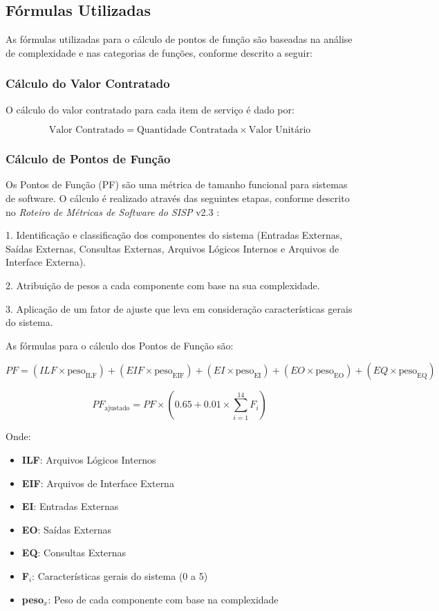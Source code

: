 \documentclass[12pt]{article}
\begin{document}
\subsection{Fórmulas Utilizadas}
As fórmulas utilizadas para o cálculo de pontos de função são baseadas na análise de complexidade e nas categorias de funções, conforme descrito a seguir:

\subsubsection{Cálculo do Valor Contratado}
O cálculo do valor contratado para cada item de serviço é dado por:

\begin{equation}
\text{Valor Contratado} = \text{Quantidade Contratada} \times \text{Valor Unitário}
\end{equation}

\subsubsection{Cálculo de Pontos de Função}

Os Pontos de Função (PF) são uma métrica de tamanho funcional para sistemas de software. O cálculo é realizado através das seguintes etapas, conforme descrito no \textit{Roteiro de Métricas de Software do SISP} v2.3 \cite{sisp}:

1. Identificação e classificação dos componentes do sistema (Entradas Externas, Saídas Externas, Consultas Externas, Arquivos Lógicos Internos e Arquivos de Interface Externa).

2. Atribuição de pesos a cada componente com base na sua complexidade.

3. Aplicação de um fator de ajuste que leva em consideração características gerais do sistema.

As fórmulas para o cálculo dos Pontos de Função são:

\begin{equation}
PF = (ILF \times \text{peso}_\text{ILF}) + (EIF \times \text{peso}_\text{EIF}) + (EI \times \text{peso}_\text{EI}) + (EO \times \text{peso}_\text{EO}) + (EQ \times \text{peso}_\text{EQ})
\end{equation}

\begin{equation}
PF_{\text{ajustado}} = PF \times (0.65 + 0.01 \times \sum_{i=1}^{14} F_i)
\end{equation}

Onde:
\begin{itemize}
    \item \textbf{ILF}: Arquivos Lógicos Internos
    \item \textbf{EIF}: Arquivos de Interface Externa
    \item \textbf{EI}: Entradas Externas
    \item \textbf{EO}: Saídas Externas
    \item \textbf{EQ}: Consultas Externas
    \item \textbf{F$_i$}: Características gerais do sistema (0 a 5)
    \item \textbf{peso$_x$}: Peso de cada componente com base na complexidade
\end{itemize}
\end{document}
